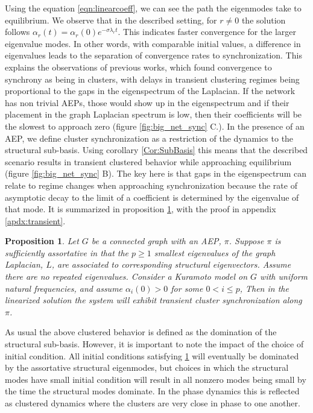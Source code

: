 \documentclass[%
 aip,
 amsmath,amssymb,
preprint,
reprint, onecolumn %
]{revtex4-1}
\newtheorem{prop}[theorem]{Proposition}
\begin{document}
Using the equation \ref{eqn:linearcoeff}, we can see the path the eigenmodes take to equilibrium. We observe that in the described setting, for $r\neq 0$ the solution follows $\alpha_r(t)=\alpha_r(0)e^{-\sigma\lambda_r t}$. This indicates faster convergence for the larger eigenvalue modes. In other words, with comparable initial values, a difference in eigenvalues leads to the separation of convergence rates to synchronization. This explains the observations of previous works,\cite{de_domenico_diffusion_2017, arenas_synchronization_2006} which found convergence to synchrony as being in clusters, with delays in transient clustering regimes being proportional to the gaps in the eigenspectrum of the Laplacian. If the network has non trivial AEPs, those would show up in the eigenspectrum and if their placement in the graph Laplacian spectrum is low, then their coefficients will be the slowest to approach zero (figure \ref{fig:big_net_sync} C.). In the presence of an AEP, we define cluster synchronization as a restriction of the dynamics to the structural sub-basis. Using corollary \ref{Cor:SubBasis} this means that the described scenario results in transient clustered behavior while approaching equilibrium (figure \ref{fig:big_net_sync} B). The key here is that gaps in the eigenspectrum can relate to regime changes when approaching synchronization because the rate of asymptotic decay to the limit of a coefficient is determined by the eigenvalue of that mode. It is summarized in proposition \ref{prop:transient}, with the proof in appendix \ref{apdx:transient}.

\begin{prop}\label{prop:transient}
     Let $G$ be a connected graph with an AEP, $\pi$. Suppose $\pi$ is sufficiently assortative in that the $p\geq 1$ smallest eigenvalues of the graph Laplacian, $L$, are associated to corresponding structural eigenvectors. Assume there are no repeated eigenvalues. Consider a Kuramoto model on $G$ with uniform natural frequencies, and assume $\alpha_i(0)>0$ for some $0<i\leq p$, Then in the linearized solution the system will exhibit transient cluster synchronization along $\pi$.
\end{prop}

As usual the above clustered behavior is defined as the domination of the structural sub-basis. However, it is important to note the impact of the choice of initial condition. All initial conditions satisfying \ref{prop:transient} will eventually be dominated by the assortative structural eigenmodes, but choices in which the structural modes have small initial condition will result in all nonzero modes being small by the time the structural modes dominate. In the phase dynamics this is reflected as clustered dynamics where the clusters are very close in phase to one another. 
\end{document}
